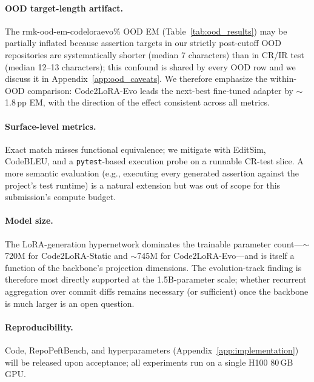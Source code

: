 \documentclass[11pt]{article}
\newcommand{\UseMacro}[1]{\csname rmk-#1\endcsname}
\newcommand{\codelora}{Code2LoRA\xspace}
\newcommand{\repopeftbench}{RepoPeftBench\xspace}
\newcommand{\codelorastatic}{\codelora-Static\xspace}
\newcommand{\codeloraevo}{\codelora-Evo\xspace}
\begin{document}
\paragraph{OOD target-length artifact.}
The \UseMacro{ood-em-codeloraevo}\% OOD EM (Table~\ref{tab:ood_results}) may be partially inflated because assertion targets in our strictly post-cutoff OOD repositories are systematically shorter (median 7 characters) than in CR/IR test (median 12--13 characters); this confound is shared by every OOD row and we discuss it in Appendix~\ref{app:ood_caveats}.
We therefore emphasize the within-OOD comparison: \codeloraevo{} leads the next-best fine-tuned adapter by ${\sim}$1.8\,pp EM, with the direction of the effect consistent across all metrics.

\paragraph{Surface-level metrics.}
Exact match misses functional equivalence; we mitigate with EditSim, CodeBLEU, and a \texttt{pytest}-based execution probe on a runnable CR-test slice.
A more semantic evaluation (e.g., executing every generated assertion against the project's test runtime) is a natural extension but was out of scope for this submission's compute budget.

\paragraph{Model size.}
The LoRA-generation hypernetwork dominates the trainable parameter count---${\sim}$720M for \codelorastatic{} and ${\sim}$745M for \codeloraevo{}---and is itself a function of the backbone's projection dimensions.
The evolution-track finding is therefore most directly supported at the 1.5B-parameter scale; whether recurrent aggregation over commit diffs remains necessary (or sufficient) once the backbone is much larger is an open question.

\paragraph{Reproducibility.}
Code, \repopeftbench{}, and hyperparameters (Appendix~\ref{app:implementation}) will be released upon acceptance; all experiments run on a single H100 80\,GB GPU.
\end{document}
